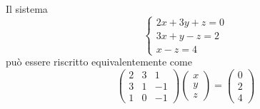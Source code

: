 \documentclass{article}     %
\begin{document}
\begin{ex}
    Il sistema 
    \[\begin{cases} 2x + 3y + z = 0\\3x + y - z = 2\\x - z = 4 \end{cases} \]
    può essere riscritto equivalentemente come \[\begin{pmatrix} 2&3&1\\3&1&- 1\\1&0&- 1 \end{pmatrix} \begin{pmatrix} x\\y\\z \end{pmatrix} = \begin{pmatrix} 0\\2\\4 \end{pmatrix} \]
\end{ex}
\end{document}
